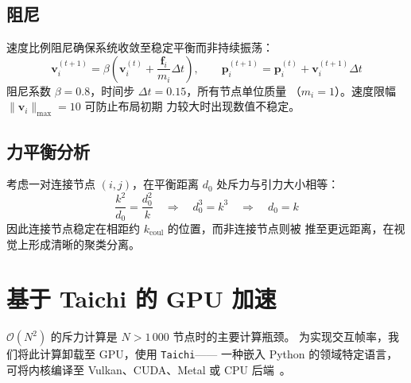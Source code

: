 \documentclass[11pt,a4paper]{report}
\begin{document}
\subsection{阻尼}
\label{sec:damping}
速度比例阻尼确保系统收敛至稳定平衡而非持续振荡：
\begin{equation}
    \mathbf{v}_i^{(t+1)} = \beta \left( \mathbf{v}_i^{(t)} +
        \frac{\mathbf{f}_i}{m_i} \Delta t \right),
    \qquad \mathbf{p}_i^{(t+1)} = \mathbf{p}_i^{(t)} +
        \mathbf{v}_i^{(t+1)} \Delta t
    \label{eq:damping}
\end{equation}
阻尼系数 $\beta = 0.8$，时间步 $\Delta t = 0.15$，所有节点单位质量
（$m_i = 1$）。速度限幅 $\|\mathbf{v}_i\|_{\max} = 10$ 可防止布局初期
力较大时出现数值不稳定。
\subsection{力平衡分析}
\label{sec:force-balance}
考虑一对连接节点 $(i,j)$，在平衡距离 $d_0$ 处斥力与引力大小相等：
\begin{equation}
    \frac{k^2}{d_0} = \frac{d_0^2}{k}
    \quad\Longrightarrow\quad
    d_0^3 = k^3
    \quad\Longrightarrow\quad
    d_0 = k
    \label{eq:equilibrium}
\end{equation}
因此连接节点稳定在相距约 $k_{\text{coul}}$ 的位置，而非连接节点则被
推至更远距离，在视觉上形成清晰的聚类分离。
\section{基于 Taichi 的 GPU 加速}
\label{sec:taichi}
$\mathcal{O}(N^2)$ 的斥力计算是 $N > 1\,000$ 节点时的主要计算瓶颈。
为实现交互帧率，我们将此计算卸载至 GPU，使用 \texttt{Taichi}——
一种嵌入 Python 的领域特定语言，可将内核编译至 Vulkan、CUDA、Metal
或 CPU 后端~\cite{hu2019taichi}。
\end{document}
